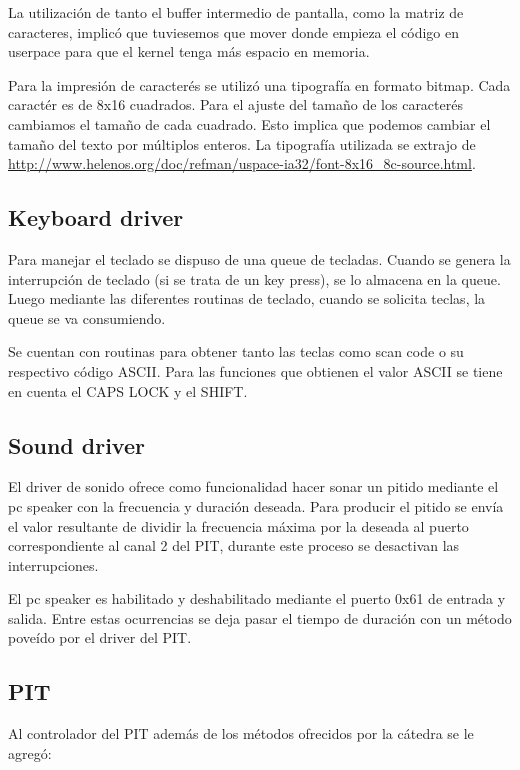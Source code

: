 \documentclass{article}
\begin{document}
La utilización de tanto el buffer intermedio de pantalla, como la matriz de caracteres, implicó que tuviesemos que mover donde empieza el código en userpace para que el kernel tenga más espacio en memoria.

Para la impresión de caracterés se utilizó una tipografía en formato bitmap. Cada caractér es de 8x16 cuadrados. Para el ajuste del tamaño de los caracterés cambiamos el tamaño de cada cuadrado. Esto implica que podemos cambiar el tamaño del texto por múltiplos enteros. La tipografía utilizada se extrajo de \url{http://www.helenos.org/doc/refman/uspace-ia32/font-8x16_8c-source.html}.

\subsection {Keyboard driver}

Para manejar el teclado se dispuso de una queue de tecladas. Cuando se genera la interrupción de teclado (si se trata de un key press), se lo almacena en la queue. Luego mediante las diferentes routinas de teclado, cuando se solicita teclas, la queue se va consumiendo.

Se cuentan con routinas para obtener tanto las teclas como scan code o su respectivo código ASCII. Para las funciones que obtienen el valor ASCII se tiene en cuenta el CAPS LOCK y el SHIFT.

\subsection {Sound driver}

El driver de sonido ofrece como funcionalidad hacer sonar un pitido mediante el pc speaker con la frecuencia y duración deseada. Para producir el pitido se envía el valor resultante de dividir la frecuencia máxima por la deseada al puerto correspondiente al canal 2 del PIT, durante este proceso se desactivan las interrupciones.

El pc speaker es habilitado y deshabilitado mediante el puerto 0x61 de entrada y salida. Entre estas ocurrencias se deja pasar el tiempo de duración con un método poveído por el driver del PIT.

\subsection {PIT}

Al controlador del PIT además de los métodos ofrecidos por la cátedra se le agregó:
\end{document}
